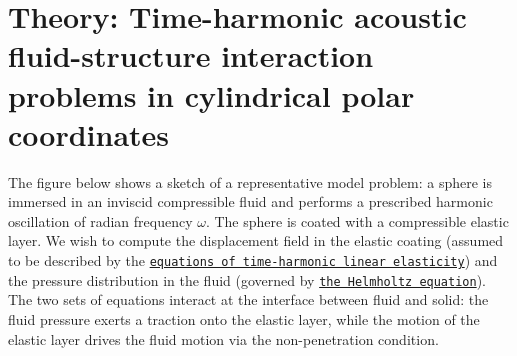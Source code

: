 \hypertarget{index_theory}{}\section{Theory\+: Time-\/harmonic acoustic fluid-\/structure interaction problems in cylindrical polar coordinates}\label{index_theory}
The figure below shows a sketch of a representative model problem\+: a sphere is immersed in an inviscid compressible fluid and performs a prescribed harmonic oscillation of radian frequency $\omega$. The sphere is coated with a compressible elastic layer. We wish to compute the displacement field in the elastic coating (assumed to be described by the \href{../../../time_harmonic_fourier_decomposed_linear_elasticity/cylinder/html/index.html}{\tt equations of time-\/harmonic linear elasticity}) and the pressure distribution in the fluid (governed by \href{../../../fourier_decomposed_helmholtz/sphere_scattering/html/index.html}{\tt the Helmholtz equation}). The two sets of equations interact at the interface between fluid and solid\+: the fluid pressure exerts a traction onto the elastic layer, while the motion of the elastic layer drives the fluid motion via the non-\/penetration condition.

